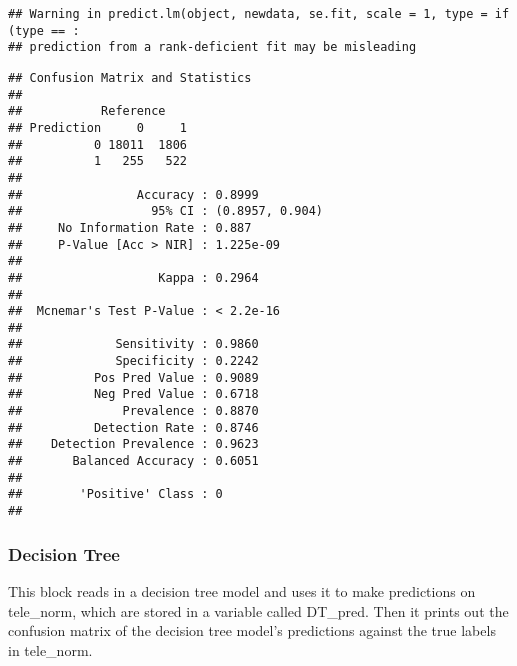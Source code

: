 \documentclass[
]{article}
\newenvironment{Shaded}{\begin{snugshade}}{\end{snugshade}}
\newcommand{\DecValTok}[1]{\textcolor[rgb]{0.00,0.00,0.81}{#1}}
\newcommand{\FunctionTok}[1]{\textcolor[rgb]{0.00,0.00,0.00}{#1}}
\newcommand{\NormalTok}[1]{#1}
\newcommand{\SpecialCharTok}[1]{\textcolor[rgb]{0.00,0.00,0.00}{#1}}
\begin{document}
\begin{verbatim}
## Warning in predict.lm(object, newdata, se.fit, scale = 1, type = if (type == :
## prediction from a rank-deficient fit may be misleading
\end{verbatim}

\begin{Shaded}
\end{Shaded}

\begin{verbatim}
## Confusion Matrix and Statistics
## 
##           Reference
## Prediction     0     1
##          0 18011  1806
##          1   255   522
##                                          
##                Accuracy : 0.8999         
##                  95% CI : (0.8957, 0.904)
##     No Information Rate : 0.887          
##     P-Value [Acc > NIR] : 1.225e-09      
##                                          
##                   Kappa : 0.2964         
##                                          
##  Mcnemar's Test P-Value : < 2.2e-16      
##                                          
##             Sensitivity : 0.9860         
##             Specificity : 0.2242         
##          Pos Pred Value : 0.9089         
##          Neg Pred Value : 0.6718         
##              Prevalence : 0.8870         
##          Detection Rate : 0.8746         
##    Detection Prevalence : 0.9623         
##       Balanced Accuracy : 0.6051         
##                                          
##        'Positive' Class : 0              
## 
\end{verbatim}

\hypertarget{decision-tree}{%
\subsubsection{Decision Tree}\label{decision-tree}}

This block reads in a decision tree model and uses it to make
predictions on tele\_norm, which are stored in a variable called
DT\_pred. Then it prints out the confusion matrix of the decision tree
model's predictions against the true labels in tele\_norm.
\end{document}
